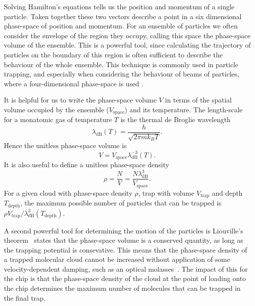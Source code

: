 Solving Hamilton's equations tells us the position and momentum of a single
particle. Taken together these two vectors describe a point in a six
dimensional phase-space of position and momentum.
%
For an ensemble of particles we often consider the envelope of the region they
occupy, calling this space the phase-space volume of the ensemble. This is a
powerful tool, since calculating the trajectory of particles on the boundary of
this region is often sufficient to describe the behaviour of the whole
ensemble. This technique is commonly used in particle trapping, and especially
when considering the behaviour of beams of particles, where a four-dimensional
phase-space is used \cite{Hand1998, Lichtenberg1969}.

It is helpful for us to write the phase-space volume $V$ in terms of the
spatial volume occupied by the ensemble ($V_\text{space}$) and its temperature.
The length-scale for a monatomic gas of temperature $T$ is the thermal de
Broglie wavelength~\cite{blundell2}
%
\begin{equation}
  \lambda_\text{dB}(T) = \frac{h}{\sqrt{2 \pi m k_B T}}.
\end{equation}
%
Hence the unitless phase-space volume is
%
\begin{equation}
  V = V_\text{space} \lambda_\text{dB}^{-3}(T).
\end{equation}
%
It is also useful to define a unitless phase-space
density~\cite{PhysRevA.52.1423}
%
\begin{equation}
  \rho = \frac{N}{V} = \frac{N \lambda_\text{dB}^3}{V_\text{space}}.
\end{equation}
%
For a given cloud with phase-space density $\rho$, trap with volume
$V_\text{trap}$ and depth $T_\text{depth}$,
the maximum possible number of particles that can be trapped is $\rho
V_\text{trap}/\lambda_\text{dB}^3(T_\text{depth})$.

A second powerful tool for determining the motion of the particles is
Liouville's theorem~\cite{Landau1982, Hand1998} states that the phase-space
volume is a conserved quantity, as long as the trapping potential is
consevative. This means that the phase-space density of a trapped molecular
cloud cannot be increased without application of some velocity-dependent
damping, such as an optical molasses~\cite{Metcalf1999}. The impact of this for
the chip is that the phase-space density of the cloud at the point of loading
onto the chip determines the maximum number of molecules that can be trapped in
the final trap.

